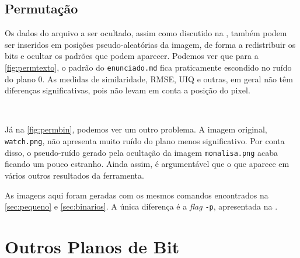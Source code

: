 \subsection{Permutação}

    Os dados do arquivo a ser ocultado, assim como discutido na , também podem ser inseridos em posições pseudo-aleatórias da imagem, de forma a redistribuir os bits e ocultar os padrões que podem aparecer. Podemos ver que para a \cref{fig:permtexto}, o padrão do \texttt{enunciado.md} fica praticamente escondido no ruído do plano 0. As medidas de similaridade, RMSE, UIQ e outras, em geral não têm diferenças significativas, pois não levam em conta a posição do pixel.

    ~

    

    Já na \cref{fig:permbin}, podemos ver um outro problema. A imagem original, \texttt{watch.png}, não apresenta muito ruído do plano menos significativo. Por conta disso, o pseudo-ruído gerado pela ocultação da imagem \texttt{monalisa.png} acaba ficando um pouco estranho. Ainda assim, é argumentável que o que aparece em vários outros resultados da ferramenta.

    As imagens aqui foram geradas com os mesmos comandos encontrados na \cref{sec:pequeno} e \cref{sec:binarios}. A única diferença é a \textit{flag} \texttt{-p}, apresentada na .

    

\section{Outros Planos de Bit}

    
    
